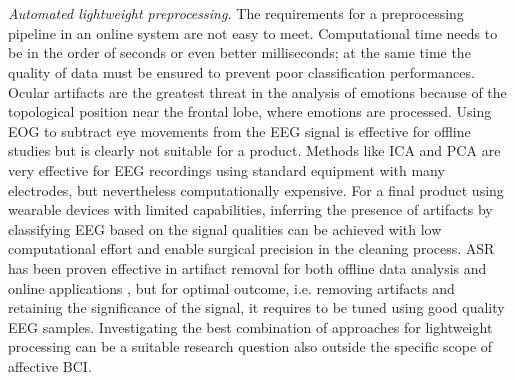 \\
\\
\emph{Automated lightweight preprocessing.} The requirements for a preprocessing pipeline in an online system are not easy to meet. Computational time needs to be in the order of seconds or even better milliseconds; at the same time the quality of data must be ensured to prevent poor classification performances. Ocular artifacts are the greatest threat in the analysis of emotions because of the topological position near the frontal lobe, where emotions are processed. Using \ac{EOG} to subtract eye movements from the EEG signal is effective for offline studies but is clearly not suitable for a product. Methods like \ac{ICA} and \ac{PCA} are very effective for \ac{EEG} recordings using standard equipment with many electrodes, but nevertheless computationally expensive. For a final product using wearable devices with limited capabilities, inferring the presence of artifacts by classifying \ac{EEG} based on the signal qualities \cite{grosselin_quality_2019} can be achieved with low computational effort and enable surgical precision in the cleaning process. \ac{ASR} has been proven effective in artifact removal for both offline data analysis and online applications \cite{chang_evaluation_2018}, but for optimal outcome, i.e. removing artifacts and retaining the significance of the signal, it requires to be tuned using good quality \ac{EEG} samples. Investigating the best combination of approaches for lightweight processing can be a suitable research question also outside the specific scope of affective \ac{BCI}.
\\
\\
